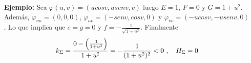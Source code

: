 \documentclass{article}
\begin{document}
\noindent\textbf{Ejemplo:} Sea $\varphi(u,v)=(ucosv,usenv,v)$ luego $E=1$, $F=0$ y $G=1+u^{2}$.
Además, $\varphi_{uu}=(0,0,0)$, $\varphi_{uv}=(-senv,cosv,0)$ y $\varphi_{vv}=(-ucosv,-usenv,0)$.
Lo que implica que $e=g=0$ y $f=-\frac{1}{\sqrt{1+u^{2}}}$. Finalmente
\begin{equation*}
    k_{\Sigma}=\frac{0-\left(\frac{1}{1+u^{2}}\right)}{1+u^{2}}=-\frac{1}{(1+u^{2})^{2}}<0
    \text{ ,}\hspace{4mm}H_{\Sigma}=0
\end{equation*}

\end{document}
